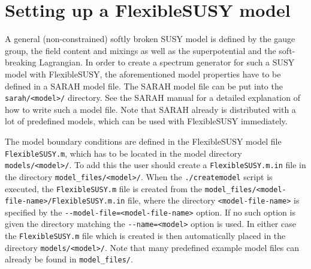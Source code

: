 \documentclass[final,3p,11pt,pdflatex]{elsarticle}
\makeatletter
\newcommand{\fs}{FlexibleSUSY\@\xspace}
\newcommand{\code}[1]{\lstinline|#1|}  %
\makeatother
\begin{document}
\section{Setting up a FlexibleSUSY model}
\label{sec:modfile}

A general (non-constrained) softly broken SUSY model is defined by the
gauge group, the field content and mixings as well as the
superpotential and the soft-breaking Lagrangian.  In order to create a
spectrum generator for such a SUSY model with \fs, the aforementioned
model properties have to be defined in a SARAH model file.  The SARAH
model file can be put into the \code{sarah/<model>/} directory.  See
the SARAH manual \cite{Staub:2008uz,Staub:2013tta} for a detailed
explanation of how to write such a model file.  Note that SARAH
already is distributed with a lot of predefined models, which can be used with
\fs immediately.

The model boundary conditions are defined in the \fs model file
\code{FlexibleSUSY.m}, which has to be located in the model directory
\code{models/<model>/}.  To add this the user should create a
\code{FlexibleSUSY.m.in} file in the directory
\code{model_files/<model>/}.  When the \code{./createmodel} script is
executed, the \code{FlexibleSUSY.m} file is created from the
\code{model_files/<model-file-name>/FlexibleSUSY.m.in} file, where the
directory \code{<model-file-name>} is specified by the
\code{--model-file=<model-file-name>} option.  If no such option is
given the directory matching the \code{--name=<model>} option is used.
In either case the \code{FlexibleSUSY.m} file which is created is then
automatically placed in the directory \code{models/<model>/}.  Note
that many predefined example model files can already be found in
\code{model_files/}.
\end{document}
